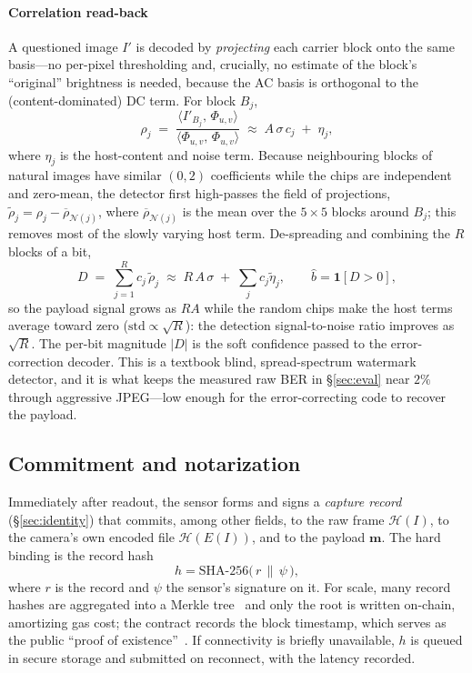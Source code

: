 \documentclass[journal]{IEEEtran}
\begin{document}
\paragraph{Correlation read-back}\label{par:readback}
A questioned image $I'$ is decoded by \emph{projecting} each carrier block onto
the same basis---no per-pixel thresholding and, crucially, no estimate of the
block's ``original'' brightness is needed, because the AC basis is orthogonal to
the (content-dominated) DC term. For block $B_j$,
\begin{equation}
\rho_j \;=\; \frac{\langle I'_{B_j},\,\Phi_{u,v}\rangle}{\langle \Phi_{u,v},\,\Phi_{u,v}\rangle}
\;\approx\; A\,\sigma\,c_j \;+\; \eta_j ,
\label{eq:residual}
\end{equation}
where $\eta_j$ is the host-content and noise term. Because neighbouring blocks
of natural images have similar $(0,2)$ coefficients while the chips are
independent and zero-mean, the detector first high-passes the field of
projections, $\tilde\rho_j=\rho_j-\overline{\rho}_{\mathcal N(j)}$, where
$\overline{\rho}_{\mathcal N(j)}$ is the mean over the $5\times5$ blocks around
$B_j$; this removes most of the slowly varying host term. De-spreading and
combining the $R$ blocks of a bit,
\begin{equation}
D \;=\; \sum_{j=1}^{R} c_j\,\tilde\rho_j \;\approx\; R\,A\,\sigma \;+\;\textstyle\sum_j c_j\tilde\eta_j ,
\qquad \hat b = \mathbf{1}[D>0],
\label{eq:despread}
\end{equation}
so the payload signal grows as $R A$ while the random chips make the host terms
average toward zero ($\mathrm{std}\!\propto\!\sqrt{R}$): the detection
signal-to-noise ratio improves as $\sqrt{R}$. The per-bit magnitude $|D|$ is the
soft confidence passed to the error-correction decoder. This is a textbook
blind, spread-spectrum watermark detector, and it is what keeps the measured raw
BER in \S\ref{sec:eval} near $2\%$ through aggressive JPEG---low enough for the
error-correcting code to recover the payload.

\subsection{Commitment and notarization}
Immediately after readout, the sensor forms and signs a \emph{capture record}
(\S\ref{sec:identity}) that commits, among other fields, to the raw frame
$\mathcal H(I)$, to the camera's own encoded file $\mathcal H(E(I))$, and to the
payload $\mathbf{m}$. The hard binding is the record hash
\begin{equation}
h = \mathrm{SHA\text{-}256}\big(\,r \,\|\, \psi\,\big),
\end{equation}
where $r$ is the record and $\psi$ the sensor's signature on it. For scale,
many record hashes are aggregated into a Merkle tree~\cite{merkle1987digital}
and only the root is written on-chain, amortizing gas cost; the contract records
the block timestamp, which serves as the public ``proof of
existence''~\cite{proofmode2023}. If connectivity is briefly unavailable, $h$ is
queued in secure storage and submitted on reconnect, with the latency recorded.
\end{document}
